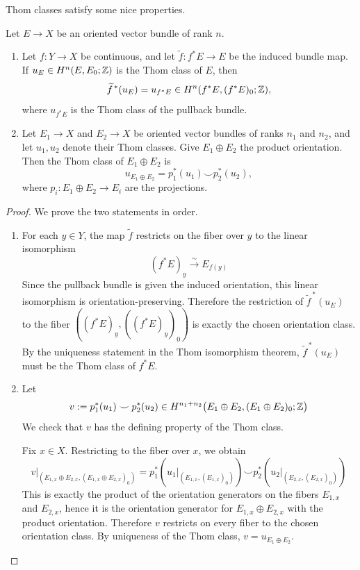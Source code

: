 \documentclass[12pt]{article}
\begin{document}
Thom classes satisfy some nice properties. 
\begin{proposition}
Let $E\to X$ be an oriented vector bundle of rank $n$.
\begin{enumerate}
    \item Let $f:Y\to X$ be continuous, and let $\widetilde f:f^*E\to E$ be the induced bundle map. If $u_E\in H^n(E,E_0;\mathbb Z)$ is the Thom class of $E$, then
    \[
    \widetilde f^{\,*}(u_E)=u_{f^*E}\in H^n(f^*E,(f^*E)_0;\mathbb Z),
    \]
    where $u_{f^*E}$ is the Thom class of the pullback bundle.

    \item Let $E_1\to X$ and $E_2\to X$ be oriented vector bundles of ranks $n_1$ and $n_2$, and let $u_1,u_2$ denote their Thom classes. Give $E_1\oplus E_2$ the product orientation. Then the Thom class of $E_1\oplus E_2$ is
    \[
    u_{E_1\oplus E_2}=p_1^*(u_1)\smile p_2^*(u_2),
    \]
    where $p_i:E_1\oplus E_2\to E_i$ are the projections.
\end{enumerate}
\end{proposition}

\begin{proof}
We prove the two statements in order.

\begin{enumerate}
    \item For each $y\in Y$, the map $\widetilde f$ restricts on the fiber over $y$ to the linear isomorphism
    \[ (f^*E)_y \xrightarrow{\sim} E_{f(y)} \]
    Since the pullback bundle is given the induced orientation, this linear isomorphism is orientation-preserving. Therefore the restriction of $\widetilde f^{\,*}(u_E)$ to the fiber $((f^*E)_y,((f^*E)_y)_0)$ is exactly the chosen orientation class. By the uniqueness statement in the Thom isomorphism theorem, $\widetilde f^{\,*}(u_E)$ must be the Thom class of $f^*E$.

    \item Let
    \[ v:=p_1^*(u_1)\smile p_2^*(u_2)\in H^{n_1+n_2}\bigl(E_1\oplus E_2,(E_1\oplus E_2)_0;\mathbb Z\bigr) \]
    We check that $v$ has the defining property of the Thom class.

    Fix $x\in X$. Restricting to the fiber over $x$, we obtain
    \[ v|_{(E_{1,x}\oplus E_{2,x},(E_{1,x}\oplus E_{2,x})_0)} = p_1^*(u_1|_{(E_{1,x},(E_{1,x})_0)})\smile p_2^*(u_2|_{(E_{2,x},(E_{2,x})_0)})\]
    This is exactly the product of the orientation generators on the fibers $E_{1,x}$ and $E_{2,x}$, hence it is the orientation generator for $E_{1,x}\oplus E_{2,x}$ with the product orientation. Therefore $v$ restricts on every fiber to the chosen orientation class. By uniqueness of the Thom class, $v=u_{E_1\oplus E_2}$.
\end{enumerate}
\end{proof}
\end{document}

